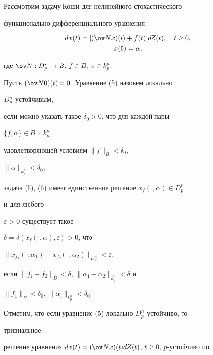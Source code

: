  


Рассмотрим задачу Коши для нелинейного стохастического 


функционально-диф\-фе\-рен\-ци\-аль\-ного уравнения 


\begin{gather} 


d x(t)=[(\ov N x)(t)+f(t)]d Z(t),\quad t\ge0,\\ 


x(0)=\alpha, 


\end{gather} 


где $\ov N:D^n_p\to B$, $f\in B$, $\alpha\in k^n_p$. 


 


 


\begin{defn} 


Пусть $(\ov N0)(t)=0$. Уравнение (5) назовем локально 


$D^n_p$-устойчивым, 


если можно указать такое $\delta_0>0$, что для каждой пары 


$\{f,\alpha\}\in B\times k^n_p$, 


удовлетворяющей условиям $\|f\|_B<\delta_0$, 


$\|\alpha\|_{k^n_p}<\delta_0$, 


задача (5), (6) имеет единственное решение $x_f(\cdot,\alpha)\in D^n_p$ 


и для любого 


$\varepsilon>0$ существует такое 


$\delta=\delta(x_f(\cdot,\alpha),\varepsilon)>0$, что 


$\|x_{f_1}(\cdot,\alpha_1)-x_{f_2}(\cdot,\alpha_2)\|_{D^n_p} 


<\varepsilon$, 


если $\|f_1-f_2\|_B<\delta$, $\|\alpha_1-\alpha_2\|_{k^n_p}<\delta$ и 


$\|f_1\|_B<\delta_0$, $\|\alpha_1\|_{k^n_p}<\delta_0$. 


\end{defn} 


 


Отметим, что если уравнение (5) локально $D^n_p$-устойчиво, то 


тривиальное 


решение уравнения $dx(t)=(\ov N x)(t)d Z(t)$, $t\ge0$, $p$-устойчиво по 


